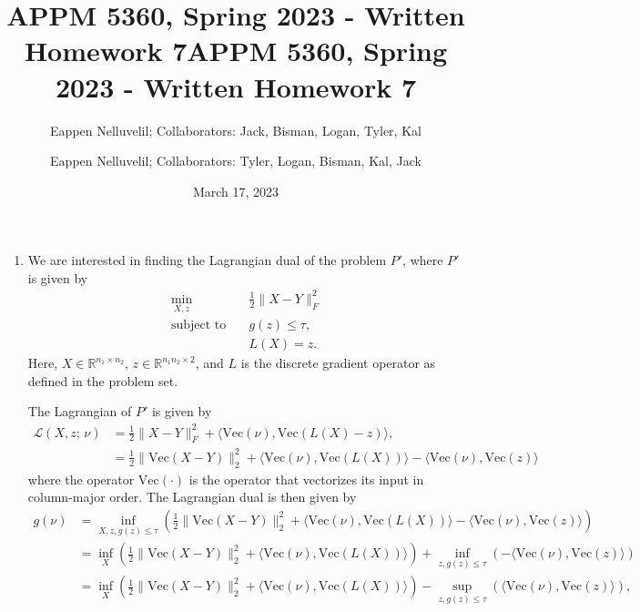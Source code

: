 \documentclass{article}
\title{APPM 5360, Spring 2023 - Written Homework 7}
\author{Eappen Nelluvelil; Collaborators: Jack, Bisman, Logan, Tyler, Kal}
\title{APPM 5360, Spring 2023 - Written Homework 7}
\author{Eappen Nelluvelil; Collaborators: Tyler, Logan, Bisman, Kal, Jack}
\date{March 17, 2023}
\newcommand{\+}[1]{\ensuremath{\boldsymbol{\rm #1}}}
\newcommand{\norm}[1]{\lVert  #1 \rVert}
\newcommand{\parens}[1]{\left( #1 \right)}
\newcommand{\angles}[1]{\langle #1 \rangle}
\begin{document}
	
	\maketitle
	
	\begin{enumerate}
		\item We are interested in finding the Lagrangian dual of the problem $P'$, where $P'$ is given by
		\begin{align*}
			\min_{X, z} & \quad \frac{1}{2} \norm{X - Y}_{F}^{2} \\
			\text{subject to} & \quad g \parens{z} \leq \tau, \\
			& \quad L \parens{X} = z.
		\end{align*}
		Here, $X \in \mathbb{R}^{n_{1} \times n_{2}}$, $z \in \mathbb{R}^{n_{1} n_{2} \times 2}$, and $L$ is the discrete gradient operator as defined in the problem set.
		
		The Lagrangian of $P'$ is given by 
		\begin{align*}
			\mathcal{L} \parens{X, z; \, \nu} & = \frac{1}{2} \norm{X - Y}_{F}^{2} + \angles{\text{Vec} \parens{\nu}, \text{Vec} \parens{ L \parens{X} - z}}, \\
			& = \frac{1}{2} \norm{\text{Vec} \parens{X - Y}}_{2}^{2} + \angles{\text{Vec} \parens{\nu}, \text{Vec} \parens{ L \parens{X}}} - \angles{ \text{Vec} \parens{\nu}, \text{Vec} \parens{z}}
		\end{align*}
		where the operator $\text{Vec} \parens{ \cdot }$ is the operator that vectorizes its input in column-major order.
		The Lagrangian dual is then given by 
		\begin{align*}
			g \parens{\nu} & = \inf_{X, z, g \parens{z} \leq \tau} \parens{ \frac{1}{2} \norm{\text{Vec} \parens{X - Y}}_{2}^{2} + \angles{\text{Vec} \parens{\nu}, \text{Vec} \parens{ L \parens{X}}} - \angles{ \text{Vec} \parens{\nu}, \text{Vec} \parens{z}}} \\
			& = \inf_{X} \parens{ \frac{1}{2} \norm{\text{Vec} \parens{X - Y}}_{2}^{2} + \angles{\text{Vec} \parens{\nu}, \text{Vec} \parens{ L \parens{X}}}} + \inf_{z, g \parens{z} \leq \tau} \parens{-\angles{ \text{Vec} \parens{\nu}, \text{Vec} \parens{z}}} \\
			& = \inf_{X} \parens{ \frac{1}{2} \norm{\text{Vec} \parens{X - Y}}_{2}^{2} + \angles{\text{Vec} \parens{\nu}, \text{Vec} \parens{ L \parens{X}}}} - \sup_{z, g \parens{z} \leq \tau} \parens{\angles{ \text{Vec} \parens{\nu}, \text{Vec} \parens{z}}},
		\end{align*}
	

\end{enumerate}
\end{document}
